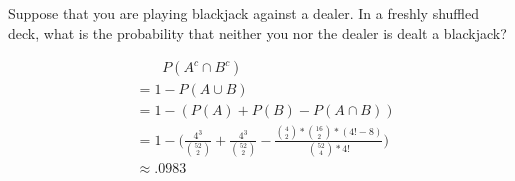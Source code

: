 \item Suppose that you are playing blackjack against a dealer. In a freshly shuffled deck, what is the probability that neither you nor the dealer is dealt a blackjack?

\begin{align*}
    &\phantom{\;=\;} P(A^c\cap B^c)\\
    &= 1 - P(A\cup B)\\
    &= 1 - (P(A) + P(B) - P(A\cap B))\\
    &= 1 
    - \Bigg (\frac{4^3}{\binom{52}{2}} + \frac{4^3}{\binom{52}{2}} 
    - \frac{\binom{4}{2} * \binom{16}{2} * (4! - 8)}{\binom{52}{4} * 4!}\Bigg )\\
    &\approx .0983
\end{align*}